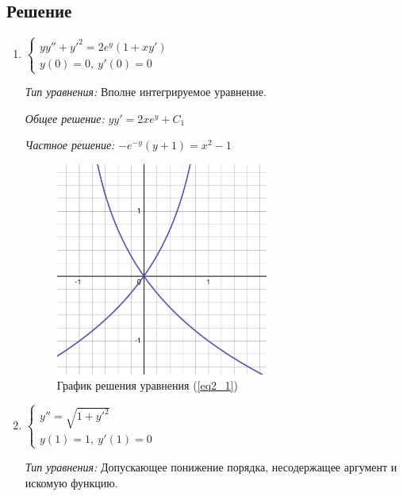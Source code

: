     \subsection{Решение}
        \begin{enumerate}
            \item \(
                \begin{cases}
                    yy'' + y'^2 = 2e^y(1 + xy')\\
                    y(0) = 0, ~ y'(0) = 0
                \end{cases}
            \) \label{eq2_1}

                \textit{Тип уравнения:}
                    Вполне интегрируемое уравнение.

                \textit{Общее решение:}
                    \( yy' = 2xe^y + C_1 \)

                \textit{Частное решение:}
                    \(-e^{-y}(y + 1) = x^2 - 1\)

                \begin{figure}[H]
                    \centering
                    \includegraphics[width=7cm]{pics/2_1.pdf}
                    \caption{График решения уравнения (\ref{eq2_1})}
                \end{figure}


            \item \(
                \begin{cases}
                    y'' = \sqrt{1 + y'^2}\\
                    y(1) = 1, ~ y'(1) = 0
                \end{cases}  
            \) \label{eq2_2}

                \textit{Тип уравнения:}
                    Допускающее понижение порядка, несодержащее аргумент и искомую функцию.


\end{enumerate}
